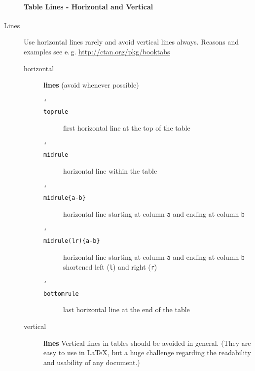 \documentclass{pharmrep}
\DeclareRobustCommand\cs[1]{\texttt{\char`\\#1}}
\newcommand{\eg}{e.\,g.\xspace}
\begin{document}
\begin{description}
   \paragraph{Table Lines - Horizontal and Vertical}
   \item[Lines] Use horizontal lines rarely and avoid vertical lines always. Reasons and examples see \eg
   \href{http://ctan.org/pkg/booktabs}{http://ctan.org/pkg/booktabs}
   \begin{description}
      \item[horizontal] \textbf{lines} (avoid whenever possible)
      \begin{description}
         \item[\cs{toprule}] first horizontal line at the top of the table
         \item[\cs{midrule}] horizontal line within the table
         \item[\cs{midrule\{a-b\}}] horizontal line starting at column \texttt{a}
         and ending at column \texttt{b}
         \item[\cs{midrule(lr)\{a-b\}}] horizontal line starting at column \texttt{a}
         and
         ending at column \texttt{b} shortened left (\texttt{l}) and right (\texttt{r})
         \item[\cs{bottomrule}] last horizontal line at the end of the table
      \end{description}
      \item[vertical] \textbf{lines} Vertical lines in tables should be avoided in general. (They are easy
      to use in \LaTeX, but a huge challenge regarding the readability and usability of any document.)
   \end{description}%
\end{description}%

\newpage
\end{document}
